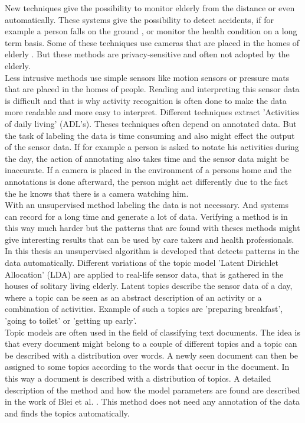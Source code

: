 \documentclass[11pt,a4paper]{article}
\begin{document}
New techniques give the possibility to monitor elderly from the distance or even automatically. These systems give the possibility to detect accidents, if for example a person falls on the ground \cite{Mubashir2013144}, or monitor the health condition on a long term basis. Some of these techniques use cameras that are placed in the homes of elderly \cite{Nagai2010204}. But these methods are privacy-sensitive and often not adopted by the elderly.\\
Less intrusive methods use simple sensors like motion sensors or pressure mats that are placed in the homes of people. Reading and interpreting this sensor data is difficult and that is why activity recognition is often done to make the data more readable and more easy to interpret. Different techniques extract 'Activities of daily living' (ADL's). Theses techniques often depend on annotated data. But the task of labeling the data is time consuming and also might effect the output of the sensor data. If for example a person is asked to notate his activities during the day, the action of annotating also takes time and the sensor data might be inaccurate. If a camera is placed in the environment of a persons home and the annotations is done afterward, the person might act differently due to the fact the he knows that there is a camera watching him.\\

With an unsupervised method labeling the data is not necessary. And systems can record for a long time and generate a lot of data. Verifying a method is in this way much harder but the patterns that are found with theses methods might give interesting results that can be used by care takers and health professionals.\\

In this thesis an unsupervised algorithm is developed that detects patterns in the data automatically. Different variations of the topic model 'Latent Dirichlet Allocation' (LDA) \cite{blei2003latent} are applied to real-life sensor data, that is gathered in the houses of solitary living elderly. Latent topics describe the sensor data of a day, where a topic can be seen as an abstract description of an activity or a combination of activities. Example of such a topics are 'preparing breakfast', 'going to toilet' or 'getting up early'.\\

Topic models are often used in the field of classifying text documents. The idea is that every document might belong to a couple of different topics and a topic can be described with a distribution over words. A newly seen document can then be assigned to some topics according to the words that occur in the document. In this way a document is described with a distribution of topics. A detailed description of the method and how the model parameters are found are described in the work of Blei et al. \cite{blei2003latent}. This method does not need any annotation of the data and finds the topics automatically.
\end{document}
